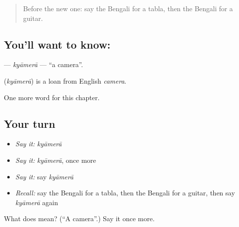 \label{lesson:BN-C131-kyamera}



\begin{quote}
Before the new one: say the Bengali for a tabla, then the Bengali for a guitar.
\end{quote}

\subsection*{You'll want to know: }
\textbf{} — \emph{kyāmerā} — \textquotedblleft{}a camera\textquotedblright{}.

\begin{cousinweb}
\textbf{} (\emph{kyāmerā}) is a loan from English \emph{camera}.
\end{cousinweb}

\begin{grammarlens}[title={What you've built}]
One more word for this chapter.
\end{grammarlens}

\subsection*{Your turn}
\begin{itemize}
\raggedright
  \item \emph{Say it:} \emph{kyāmerā}
  \item \emph{Say it:} \emph{kyāmerā}, once more
  \item \emph{Say it:} say \emph{kyāmerā}
  \item \emph{Recall:} say the Bengali for a tabla, then the Bengali for a guitar, then say \emph{kyāmerā} again
\end{itemize}

\begin{tcolorbox}[breakable,colback=teal!4,colframe=teal!35!black,title={Before you move on}]
What does  mean? (\textquotedblleft{}A camera\textquotedblright{}.) Say it once more.
\end{tcolorbox}
